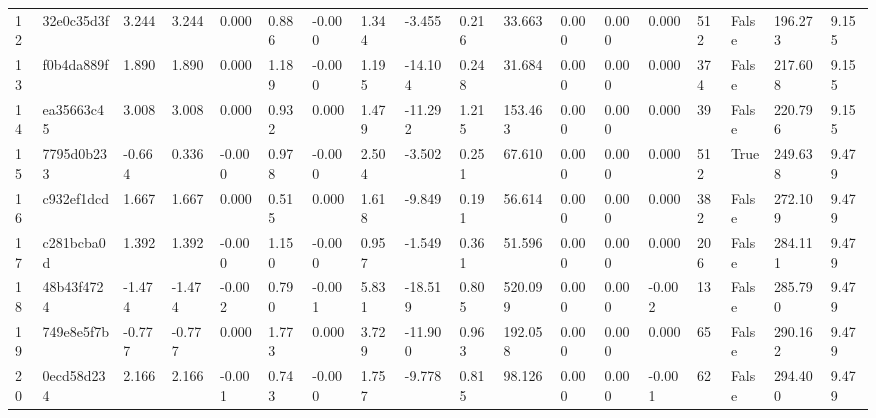 \begin{table}[t]
\begin{tabular}{llllllllllllllllll}
12 & 32e0c35d3f & 3.244 & 3.244 & 0.000 & 0.886 & -0.000 & 1.344 & -3.455 & 0.216 & 33.663 & 0.000 & 0.000 & 0.000 & 512 & False & 196.273 & 9.155 \\
13 & f0b4da889f & 1.890 & 1.890 & 0.000 & 1.189 & -0.000 & 1.195 & -14.104 & 0.248 & 31.684 & 0.000 & 0.000 & 0.000 & 374 & False & 217.608 & 9.155 \\
14 & ea35663c45 & 3.008 & 3.008 & 0.000 & 0.932 & 0.000 & 1.479 & -11.292 & 1.215 & 153.463 & 0.000 & 0.000 & 0.000 & 39 & False & 220.796 & 9.155 \\
15 & 7795d0b233 & -0.664 & 0.336 & -0.000 & 0.978 & -0.000 & 2.504 & -3.502 & 0.251 & 67.610 & 0.000 & 0.000 & 0.000 & 512 & True & 249.638 & 9.479 \\
16 & c932ef1dcd & 1.667 & 1.667 & 0.000 & 0.515 & 0.000 & 1.618 & -9.849 & 0.191 & 56.614 & 0.000 & 0.000 & 0.000 & 382 & False & 272.109 & 9.479 \\
17 & c281bcba0d & 1.392 & 1.392 & -0.000 & 1.150 & -0.000 & 0.957 & -1.549 & 0.361 & 51.596 & 0.000 & 0.000 & 0.000 & 206 & False & 284.111 & 9.479 \\
18 & 48b43f4724 & -1.474 & -1.474 & -0.002 & 0.790 & -0.001 & 5.831 & -18.519 & 0.805 & 520.099 & 0.000 & 0.000 & -0.002 & 13 & False & 285.790 & 9.479 \\
19 & 749e8e5f7b & -0.777 & -0.777 & 0.000 & 1.773 & 0.000 & 3.729 & -11.900 & 0.963 & 192.058 & 0.000 & 0.000 & 0.000 & 65 & False & 290.162 & 9.479 \\
20 & 0ecd58d234 & 2.166 & 2.166 & -0.001 & 0.743 & -0.000 & 1.757 & -9.778 & 0.815 & 98.126 & 0.000 & 0.000 & -0.001 & 62 & False & 294.400 & 9.479 \\
\bottomrule
\end{tabular}
\end{table}
